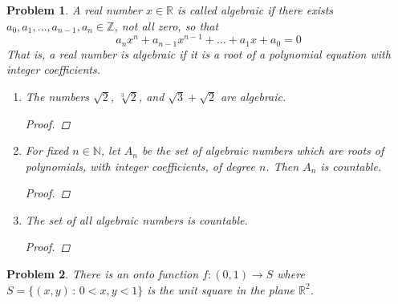 \documentclass[12pt]{article}
\newtheorem{problem}{Problem}
\newcommand{\NN}{\ensuremath{\mathbb N}}
\newcommand{\RR}{\ensuremath{\mathbb R}}
\newcommand{\ZZ}{\ensuremath{\mathbb Z}}
\begin{document}
\renewcommand{\labelenumi}{(\alph{enumi})}

\begin{problem} %
A real number $x\in\RR$ is called \emph{algebraic} if there exists $a_0, a_1, \dots, a_{n-1}, a_n \in \ZZ$, not all zero, so that
	$$a_n x^n + a_{n-1} x^{n-1} + \dots + a_1 x + a_0 = 0$$
That is, a real number is algebraic if it is a root of a polynomial equation with integer coefficients.

\begin{enumerate}
\item The numbers $\sqrt{2}$, $\sqrt[3]{2}$, and $\sqrt{3} + \sqrt{2}$ are algebraic.

\begin{proof}
\end{proof}

\item For fixed $n\in\NN$, let $A_n$ be the set of algebraic numbers which are roots of polynomials, with integer coefficients, of degree $n$.  Then $A_n$ is countable.

\begin{proof}
\end{proof}

\item The set of all algebraic numbers is countable.

\begin{proof}
\end{proof}
\end{enumerate}
\end{problem}


\begin{problem} %
There is an onto function $f:(0,1) \to S$ where $S=\{(x,y)\,:\,0<x,y<1\}$ is the unit square in the plane $\RR^2$.
\end{problem}

\end{document}
